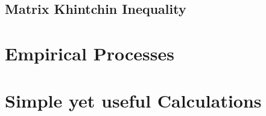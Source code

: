 \documentclass[12pt]{scrreport}
\begin{document}
 \section{Matrix Khintchin Inequality}
  
%

\chapter{Empirical Processes}


\chapter{Simple yet useful Calculations} 



\printnomenclature

{}

\end{document}
